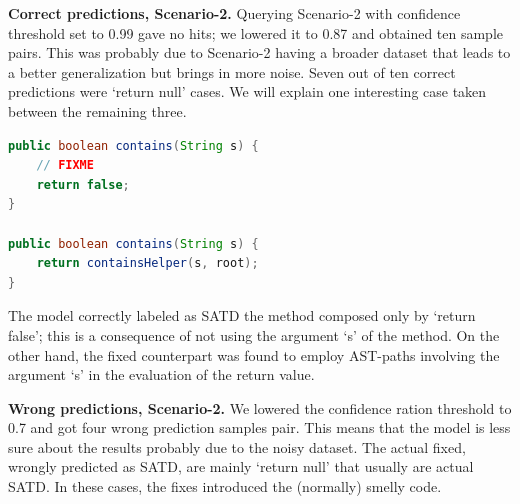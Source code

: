 \textbf{Correct predictions, Scenario-2.}
 Querying Scenario-2 with confidence threshold set to 0.99 gave no hits; we lowered it to 0.87 and obtained ten sample pairs. This was probably due to Scenario-2 having a broader dataset that leads to a better generalization but brings in more noise. 
 Seven out of ten correct predictions were `return null' cases. We will explain one interesting case taken between the remaining three.


\begin{lstlisting}[caption={Scenario-2 correct predictions, verbatim source code}, label={lst:scenario_2_correct},language=Java]
public boolean contains(String s) {
    // FIXME
    return false;
}

public boolean contains(String s) {
    return containsHelper(s, root);
}
\end{lstlisting}

The model correctly labeled as SATD the method composed only by `return false'; this is a consequence of not using the argument `s' of the method. On the other hand, the fixed counterpart was found to employ AST-paths involving the argument `s' in the evaluation of the return value.

\textbf{Wrong predictions, Scenario-2.}
We lowered the confidence ration threshold to 0.7 and got four wrong prediction samples pair. This means that the model is less sure about the results probably due to the noisy dataset.
The actual fixed, wrongly predicted as SATD, are mainly `return null' that usually are actual SATD. In these cases, the fixes introduced the (normally) smelly code.